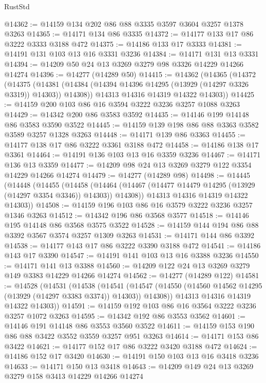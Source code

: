 \begin{lexlean}{RustStd}
\begin{coremodule}
{\begin{coremodule}
{{{{{{{{{{{{{{{{{{{{{{{{{{{{{{{{{{{{{@14362 := @14159 @134 @202 @86 @88 @3335 @3597 @3604 @3257 @1378 @3263
@14365 := @14171 @134 @86 @3335
@14372 := @14177 @133 @17 @86 @3222 @3333 @3188 @472
@14375 := @14186 @133 @17 @3333
@14381 := @14191 @131 @103 @13 @16 @3331 @3236
@14384 := @14171 @131 @13 @3331
@14394 := @14209 @50 @24 @13 @3269 @3279 @98 @3326 @14229 @14266 @14274
@14396 := @14277 (@14289 @50)
@14415 := @14362
    (@14365
      (@14372
        (@14375
          (@14381 (@14384 (@14394 @14396 @14295 (@13929 (@14297 @3326 @3319)) @14303)) @14308))
        @14313
        @14316
        @14319
        @14322
        @14303))
@14425 := @14159 @200 @103 @86 @16 @3594 @3222 @3236 @3257 @1088 @3263
@14429 := @14342 @200 @86 @3583 @3592
@14435 := @14146 @199 @14148 @86 @3583 @3590 @3522
@14445 := @14159 @139 @198 @86 @88 @3363 @3582 @3589 @3257 @1328 @3263
@14448 := @14171 @139 @86 @3363
@14455 := @14177 @138 @17 @86 @3222 @3361 @3188 @472
@14458 := @14186 @138 @17 @3361
@14464 := @14191 @136 @103 @13 @16 @3359 @3236
@14467 := @14171 @136 @13 @3359
@14477 := @14209 @98 @24 @13 @3269 @3279 @122 @3354 @14229 @14266 @14274
@14479 := @14277 (@14289 @98)
@14498 := @14445
    (@14448
      (@14455
        (@14458
          (@14464 (@14467 (@14477 @14479 @14295 (@13929 (@14297 @3354 @3346)) @14303)) @14308))
        @14313
        @14316
        @14319
        @14322
        @14303))
@14508 := @14159 @196 @103 @86 @16 @3579 @3222 @3236 @3257 @1346 @3263
@14512 := @14342 @196 @86 @3568 @3577
@14518 := @14146 @195 @14148 @86 @3568 @3575 @3522
@14528 := @14159 @144 @194 @86 @88 @3392 @3567 @3574 @3257 @1309 @3263
@14531 := @14171 @144 @86 @3392
@14538 := @14177 @143 @17 @86 @3222 @3390 @3188 @472
@14541 := @14186 @143 @17 @3390
@14547 := @14191 @141 @103 @13 @16 @3388 @3236
@14550 := @14171 @141 @13 @3388
@14560 := @14209 @122 @24 @13 @3269 @3279 @149 @3383 @14229 @14266 @14274
@14562 := @14277 (@14289 @122)
@14581 := @14528
    (@14531
      (@14538
        (@14541
          (@14547 (@14550 (@14560 @14562 @14295 (@13929 (@14297 @3383 @3374)) @14303)) @14308))
        @14313
        @14316
        @14319
        @14322
        @14303))
@14591 := @14159 @192 @103 @86 @16 @3564 @3222 @3236 @3257 @1072 @3263
@14595 := @14342 @192 @86 @3553 @3562
@14601 := @14146 @191 @14148 @86 @3553 @3560 @3522
@14611 := @14159 @153 @190 @86 @88 @3422 @3552 @3559 @3257 @951 @3263
@14614 := @14171 @153 @86 @3422
@14621 := @14177 @152 @17 @86 @3222 @3420 @3188 @472
@14624 := @14186 @152 @17 @3420
@14630 := @14191 @150 @103 @13 @16 @3418 @3236
@14633 := @14171 @150 @13 @3418
@14643 := @14209 @149 @24 @13 @3269 @3279 @158 @3413 @14229 @14266 @14274
}}}}}}}}}}}}}}}}}}}}}}}}}}}}}}}}}}}}}
\end{coremodule}}
\end{coremodule}
\end{lexlean}
